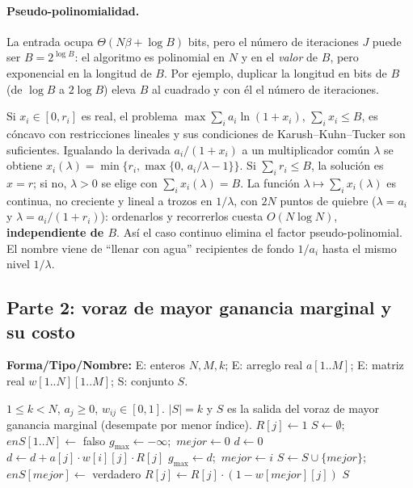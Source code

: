 \paragraph{Pseudo-polinomialidad.} La entrada ocupa $\Theta(N\beta+\log B)$ bits, pero el número de iteraciones $J$ puede ser $B=2^{\log B}$: el algoritmo es polinomial en $N$ y en el \emph{valor} de $B$, pero exponencial en la longitud de $B$. Por ejemplo, duplicar la longitud en bits de $B$ (de $\log B$ a $2\log B$) eleva $B$ al cuadrado y con él el número de iteraciones.

\begin{observacion}\label{obs:waterfilling}
Si $x_i\in[0,r_i]$ es real, el problema $\max\sum_ia_i\ln(1+x_i)$, $\sum_ix_i\le B$, es cóncavo con restricciones lineales y sus condiciones de Karush–Kuhn–Tucker son suficientes. Igualando la derivada $a_i/(1+x_i)$ a un multiplicador común $\lambda$ se obtiene $x_i(\lambda)=\min\{r_i,\max\{0,\,a_i/\lambda-1\}\}$. Si $\sum_ir_i\le B$, la solución es $x=r$; si no, $\lambda>0$ se elige con $\sum_ix_i(\lambda)=B$. La función $\lambda\mapsto\sum_ix_i(\lambda)$ es continua, no creciente y lineal a trozos en $1/\lambda$, con $2N$ puntos de quiebre ($\lambda=a_i$ y $\lambda=a_i/(1+r_i)$): ordenarlos y recorrerlos cuesta $O(N\log N)$, \textbf{independiente de $B$}. Así el caso continuo elimina el factor pseudo-polinomial. El nombre viene de ``llenar con agua'' recipientes de fondo $1/a_i$ hasta el mismo nivel $1/\lambda$.
\end{observacion}

\subsection{Parte 2: voraz de mayor ganancia marginal y su costo}\label{sec:costoP2}

\begin{algorithm}[h]
\caption{\textsc{VorazSelección} (modo \texttt{k}, con $R_j$ incremental)}\label{alg:voraz}
\textbf{Forma/Tipo/Nombre:} E: enteros $N,M,k$; E: arreglo real $a[1..M]$; E: matriz real $w[1..N][1..M]$; S: conjunto $S$.
\begin{algorithmic}[1]
\Require $1\le k<N$, $a_j\ge0$, $w_{ij}\in[0,1]$.
\Ensure $|S|=k$ y $S$ es la salida del voraz de mayor ganancia marginal (desempate por menor índice).
  \State $R[j]\gets 1$
\EndFor
\State $S\gets\emptyset$;\ $enS[1..N]\gets$ falso
  \State $g_{\max}\gets-\infty$;\ $mejor\gets 0$
      \State $d\gets 0$
        \State $d\gets d+a[j]\cdot w[i][j]\cdot R[j]$
      \EndFor
        \State $g_{\max}\gets d$;\ $mejor\gets i$
      \EndIf
    \EndIf
  \EndFor
  \State $S\gets S\cup\{mejor\}$;\ $enS[mejor]\gets$ verdadero
    \State $R[j]\gets R[j]\cdot(1-w[mejor][j])$
  \EndFor
\EndFor
\State \Return $S$
\end{algorithmic}
\end{algorithm}

